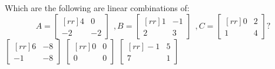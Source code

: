 \ii Which are the following are linear combinations of:
$$A =
\begin{bmatrix}[rr]
4&0\\
-2&-2
\end{bmatrix}
\hspace{5pt}, 
B =
\begin{bmatrix}[rr]
1&-1\\
2&3
\end{bmatrix}
\hspace{5pt}, 
C=
\begin{bmatrix}[rr]
0&2\\
1&4
\end{bmatrix}?
$$
\bb
\ii 
$
\begin{bmatrix}[rr]
6&-8\\
-1&-8
\end{bmatrix}
$
\ii 
$
\begin{bmatrix}[rr]
0&0\\
0&0
\end{bmatrix}
$
\ii
$
\begin{bmatrix}[rr]
-1&5\\
7&1
\end{bmatrix}
$

\ee


